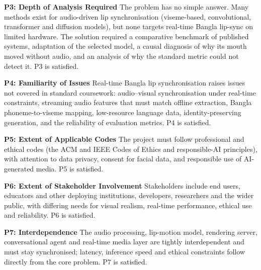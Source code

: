 \vspace{0.7em}

\noindent
\textbf{P3: Depth of Analysis Required}
\noindent
The problem has no simple answer. Many methods exist for audio-driven lip synchronisation (viseme-based, convolutional, transformer and diffusion models), but none targets real-time Bangla lip-sync on limited hardware. The solution required a comparative benchmark of published systems, adaptation of the selected model, a causal diagnosis of why its mouth moved without audio, and an analysis of why the standard metric could not detect it. P3 is satisfied.


\vspace{0.7em}

\noindent
\textbf{P4: Familiarity of Issues}
\noindent
Real-time Bangla lip synchronisation raises issues not covered in standard coursework: audio--visual synchronisation under real-time constraints, streaming audio features that must match offline extraction, Bangla phoneme-to-viseme mapping, low-resource language data, identity-preserving generation, and the reliability of evaluation metrics. P4 is satisfied.

\vspace{0.7em}

\noindent
\textbf{P5: Extent of Applicable Codes}
\noindent
The project must follow professional and ethical codes (the ACM and IEEE Codes of Ethics and responsible-AI principles), with attention to data privacy, consent for facial data, and responsible use of AI-generated media. P5 is satisfied.

\vspace{0.7em}

\noindent
\textbf{P6: Extent of Stakeholder Involvement}
\noindent
Stakeholders include end users, educators and other deploying institutions, developers, researchers and the wider public, with differing needs for visual realism, real-time performance, ethical use and reliability. P6 is satisfied.

\vspace{0.7em}

\noindent
\textbf{P7: Interdependence}
\noindent
The audio processing, lip-motion model, rendering server, conversational agent and real-time media layer are tightly interdependent and must stay synchronised; latency, inference speed and ethical constraints follow directly from the core problem. P7 is satisfied.


